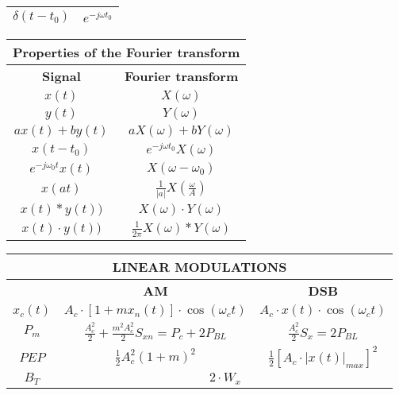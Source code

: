 \documentclass[en]{article}
\begin{document}
\begin{center}
\begin{tabular}{|c|c|}
        \hline
        $\delta(t-t_0)$ & $e^{-j \omega t_0}$ \\
        \hline
    \end{tabular}
    \renewcommand{\arraystretch}{1}
    \vspace{1.5cm}
    \renewcommand{\arraystretch}{1.5}
    \begin{tabular}{|c|c|}
        \multicolumn{2}{c}{{\bf Properties of the Fourier transform }} \\
        \hline
        {\bf Signal} & {\bf Fourier transform} \\
        \hline
        $x(t)$ & $X(\omega)$ \\
        \hline
        $y(t)$ & $Y(\omega)$ \\
        \hline
        $a x(t) + b y(t) $ & $a X(\omega) + b Y(\omega)$ \\
        \hline
        $x(t-t_0)$ & $e^{-j \omega t_0} X(\omega)$ \\
        \hline
        $e^{-j\omega_0 t} x(t)$ & $X(\omega - \omega_0)$ \\
        \hline
        $x(at)$ & $\displaystyle\frac{1}{|a|}X \left ( \displaystyle\frac{\omega}{A} \right )$ \\
        \hline
        $x(t) \ast y(t))$ & $X(\omega) \cdot Y(\omega)$ \\
        \hline
        $x(t) \cdot y(t))$ & $\displaystyle\frac{1}{2\pi} X(\omega) \ast Y(\omega)$ \\
        \hline
      
    \end{tabular}
    \renewcommand{\arraystretch}{1}
    \vspace{0.5cm}

 

    \renewcommand{\arraystretch}{2}
    \begin{tabular}{|c|c|c|}
        \multicolumn{3}{c}{{\bf LINEAR MODULATIONS }} \\
        \hline
        & {\bf AM } & {\bf DSB} \\
        \hline
        $x_c(t)$ & $A_c \cdot [1 + m x_n(t)] \cdot \cos(\omega_c t)$ & $A_c \cdot x(t) \cdot \cos(\omega_c t)$ \\
        \hline
        $P_m$ & $\displaystyle\frac{A_c^2}{2} + \displaystyle\frac{m^2 A_c^2}{2} S_{xn} = P_c + 2P_{BL}$ & $\displaystyle\frac{A_c^2}{2}S_x = 2 P_{BL}$ \\
        \hline
        $PEP$ & $\displaystyle\frac{1}{2} A_c^2 (1+m)^2$ & $\displaystyle\frac{1}{2} [A_c \cdot |x(t)|_{max}]^2$ \\
        \hline
        $B_T$ & \multicolumn{2}{c|}{$2 \cdot W_x$} \\
        \hline
    \end{tabular}


\end{center}
\end{document}
